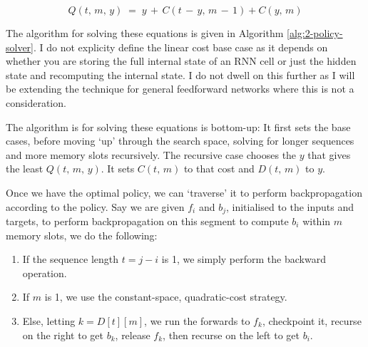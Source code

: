 \begin{equation*}
    Q(t,\, m,\, y) \;=\; y \,+\, C(t\,-\,y,\, m\,-\,1) + C(y,\, m)
\end{equation*}

The algorithm for solving these equations is given in Algorithm \ref{alg:2-policy-solver}.
I do not explicity define the linear cost base case as it depends on whether you are storing the full internal state of an RNN cell or just the hidden state and recomputing the internal state.
I do not dwell on this further as I will be extending the technique for general feedforward networks where this is not a consideration.

The algorithm is for solving these equations is bottom-up:
It first sets the base cases, before moving `up' through the search space, solving for longer sequences and more memory slots recursively.
The recursive case chooses the \(y\) that gives the least \(Q(t,\, m,\, y)\).
It sets \(C(t,\, m)\) to that cost and \(D(t,\,m)\) to \(y\).

Once we have the optimal policy, we can `traverse' it to perform backpropagation according to the policy.
Say we are given \(f_i\) and \(b_j\), initialised to the inputs and targets, to perform backpropagation on this segment to compute \(b_i\) within \(m\) memory slots, we do the following:
\begin{enumerate}[topsep=0.1em]
    \item If the sequence length \(t = j-i\) is 1, we simply perform the backward operation.
    \item If \(m\) is 1, we use the constant-space, quadratic-cost strategy.
    \item Else, letting \(k = D[t][m]\), we run the forwards to \(f_k\), checkpoint it, recurse on the right to get \(b_k\), release \(f_k\), then recurse on the left to get \(b_i\).
\end{enumerate}

\vspace{1.5cm}

